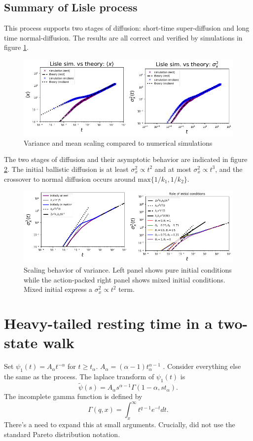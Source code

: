 \documentclass[11pt]{article}
\newcommand\be{\begin{equation}} %
\newcommand\ee{\end{equation}}   %
\begin{document}
\subsection{Summary of Lisle process}
This process supports two stages of diffusion: short-time super-diffusion and long time normal-diffusion.
The results are all correct and verified by simulations in figure \ref{fig:lislesims}.
\begin{figure}[h]
	\centering
	\includegraphics[width=\linewidth,keepaspectratio]{combo1.png}
	\caption{Variance and mean scaling compared to numerical simulations}
	\label{fig:lislesims}
\end{figure}

The two stages of diffusion and their asymptotic behavior are indicated in figure \ref{fig:lisledif}. The initial ballistic diffusion is at least $\sigma_x^2 \propto t^2$ and at most $\sigma_x^2 \propto t^3$, and the crossover to normal diffusion occurs around $\text{max}\{1/k_1,1/k_2\}.$
\begin{figure}[h]
	\centering
	\includegraphics[width=\linewidth,keepaspectratio]{combo2.png}
	\caption{Scaling behavior of variance. Left panel shows pure initial conditions while the action-packed right panel shows mixed initial conditions. Mixed initial express a $\sigma_x^2 \propto t^2$ term. }
	\label{fig:lisledif}
\end{figure}

\section{Heavy-tailed resting time in a two-state walk}
Set $\psi_1(t) = A_\alpha t^{-\alpha}$ for $t\geq t_\alpha$.
$A_\alpha = (\alpha-1)t_\alpha^{\alpha-1}$ \citep[e.g.][eq. 12]{Weeks1996}.
Consider everything else the same as the \citet{Lisle1998} process.
The laplace transform of $\psi_1(t)$ is
\be \tilde{\psi}(s) = A_\alpha s^{\alpha-1}\Gamma(1-\alpha,st_\alpha).\ee
The incomplete gamma function is defined by 
\be \Gamma(q,x) = \int_x^\infty t^{q-1}e^{-t}dt.\ee
There's a need to expand this at small arguments.
Crucially, \citet{Weeks1996} did not use the standard Pareto distribution notation.
\end{document}
